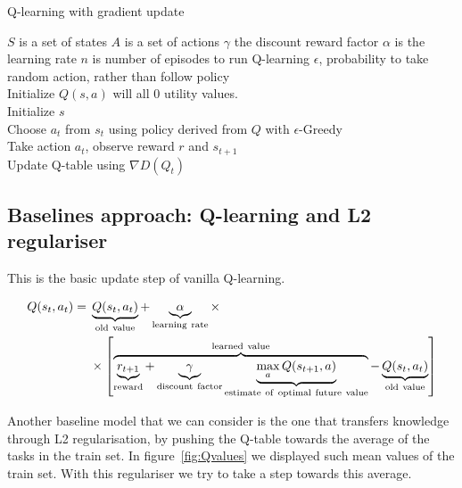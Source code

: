 \begin{algorithm}[H]
\caption{Q-learning with gradient update}
\begin{algorithmic}[1]
\Require
 	\State $S$ is a set of states
 	\State $A$ is a set of actions
 	\State $\gamma$ the discount reward factor
 	\State $\alpha$ is the learning rate
 	\State $n$ is number of episodes to run Q-learning
 	\State $\epsilon$, probability to take random action, rather than follow policy
 {}
\\Initialize $Q(s,a)$ will all 0 utility values.
\\ \qquad Initialize $s$
\\ \qquad \qquad Choose $a_t$ from $s_t$ using policy derived from $Q$ with $\epsilon$-Greedy
\\ \qquad \qquad Take action $a_t$, observe reward $r$ and $s_{t+1}$
\\ \qquad \qquad Update Q-table using $\nabla D(Q_{t})$
\EndFor
\EndFor
\EndProcedure
\end{algorithmic}
\end{algorithm}

\subsection{Baselines approach: Q-learning and L2 regulariser}
\label{ssec:QlearningBaseline}

This is the basic update step of vanilla Q-learning.

\begin{equation} \label{eq:QlearningUpdate}
\begin{aligned}
  Q(s_{t},a_{t}) ={} & \underbrace{Q(s_t,a_t)}_{\rm old~value} +
  \underbrace{\alpha}_{\rm learning~rate} \times \\
   & \times \left[
    \overbrace{\underbrace{r_{t+1}}_{\rm reward} + \underbrace{\gamma}_{\rm
        discount~factor} \underbrace{\max_{a}Q(s_{t+1}, a)}_{\rm
        estimate~of~optimal~future~value}}^{\rm learned~value} -
    \underbrace{Q(s_t,a_t)}_{\rm old~value} \right]
\end{aligned}
\end{equation}

Another baseline model that we can consider is the one that transfers knowledge through L2 regularisation, by pushing the Q-table towards the average of the tasks in the train set. In figure~\ref{fig:Qvalues} we displayed such mean values of the train set. With this regulariser we try to take a step towards this average.

